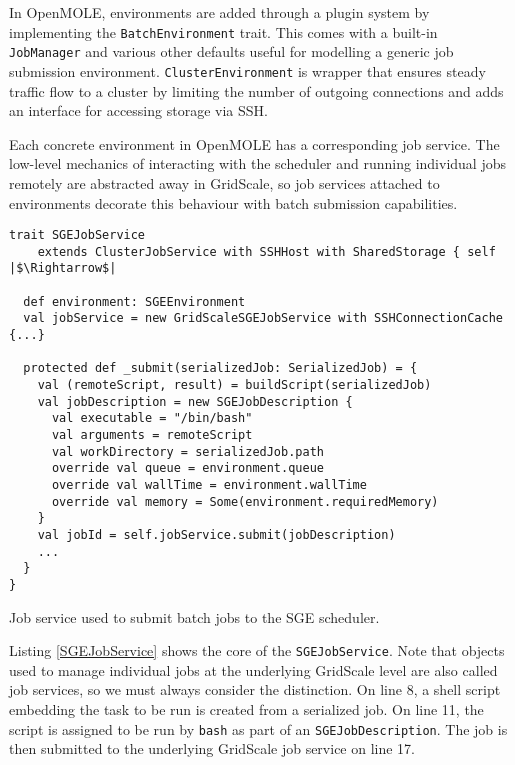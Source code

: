 In OpenMOLE, environments are added through a plugin system by implementing the \verb|BatchEnvironment| trait. This comes with a built-in \verb|JobManager| and various other defaults useful for modelling a generic job submission environment. \verb|ClusterEnvironment| is wrapper that ensures steady traffic flow to a cluster by limiting the number of outgoing connections and adds an interface for accessing storage via SSH.

Each concrete environment in OpenMOLE has a corresponding job service. The low-level mechanics of interacting with the scheduler and running individual jobs remotely are abstracted away in GridScale, so job services attached to environments decorate this behaviour with batch submission capabilities. 

\begin{listing}[h]
	\centering
	\begin{minipage}{14.2cm}
		\begin{verbatim}
trait SGEJobService 
    extends ClusterJobService with SSHHost with SharedStorage { self |$\Rightarrow$|

  def environment: SGEEnvironment
  val jobService = new GridScaleSGEJobService with SSHConnectionCache {...}

  protected def _submit(serializedJob: SerializedJob) = {
    val (remoteScript, result) = buildScript(serializedJob)
    val jobDescription = new SGEJobDescription {
      val executable = "/bin/bash"
      val arguments = remoteScript
      val workDirectory = serializedJob.path
      override val queue = environment.queue
      override val wallTime = environment.wallTime
      override val memory = Some(environment.requiredMemory)
    }
    val jobId = self.jobService.submit(jobDescription)
    ...
  }
}
		\end{verbatim}
	\end{minipage}
	\caption{Job service used to submit batch jobs to the SGE scheduler.}
	\label{SGEJobService}
\end{listing}

Listing \ref{SGEJobService} shows the core of the \verb|SGEJobService|. Note that objects used to manage individual jobs at the underlying GridScale level are also called job services, so we must always consider the distinction. On line 8, a shell script embedding the task to be run is created from a serialized job. On line 11, the script is assigned to be run by \verb|bash| as part of an \verb|SGEJobDescription|. The job is then submitted to the underlying GridScale job service on line 17.


